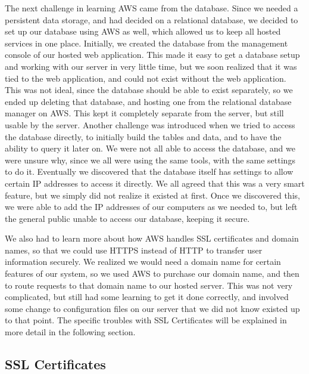\documentclass[12pt]{report}
\let\Oldsubsection\subsection
\renewcommand{\subsection}{\FloatBarrier\Oldsubsection}
\begin{document}
The next challenge in learning AWS came from the database. Since we needed a
persistent data storage, and had decided on a relational database, we decided to set up our
database using AWS as well, which allowed us to keep all hosted services in one place. Initially,
we created the database from the management console of our hosted web application. This made
it easy to get a database setup and working with our server in very little time, but we soon
realized that it was tied to the web application, and could not exist without the web application.
This was not ideal, since the database should be able to exist separately, so we ended up deleting
that database, and hosting one from the relational database manager on AWS. This kept it
completely separate from the server, but still usable by the server. Another challenge was
introduced when we tried to access the database directly, to initially build the tables and data,
and to have the ability to query it later on. We were not all able to access the database, and we
were unsure why, since we all were using the same tools, with the same settings to do it.
Eventually we discovered that the database itself has settings to allow certain IP addresses to
access it directly. We all agreed that this was a very smart feature, but we simply did not realize
it existed at first. Once we discovered this, we were able to add the IP addresses of our
computers as we needed to, but left the general public unable to access our database, keeping it
secure.

We also had to learn more about how AWS handles SSL certificates and domain names,
so that we could use HTTPS instead of HTTP to transfer user information securely. We realized
we would need a domain name for certain features of our system, so we used AWS to purchase
our domain name, and then to route requests to that domain name to our hosted server. This was
not very complicated, but still had some learning to get it done correctly, and involved some
change to configuration files on our server that we did not know existed up to that point. The
specific troubles with SSL Certificates will be explained in more detail in the following section.

\subsection{SSL Certificates} \label{ssl-certificates}

\end{document}
